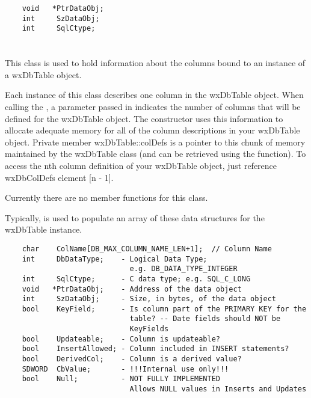 \begin{verbatim}
    void   *PtrDataObj;
    int     SzDataObj;
    int     SqlCtype;
\end{verbatim}


\section{}\label{wxdbcoldef}

This class is used to hold information about the columns bound to an 
instance of a wxDbTable object.  

Each instance of this class describes one column in the wxDbTable 
object.  When calling the , a 
parameter passed in indicates the number of columns that will be defined for 
the wxDbTable object.  The constructor uses this information to allocate 
adequate memory for all of the column descriptions in your wxDbTable object.  
Private member wxDbTable::colDefs is a pointer to this chunk of memory 
maintained by the wxDbTable class (and can be retrieved using the 
 function).  
To access the nth column definition of your wxDbTable object, just reference 
wxDbColDefs element [n - 1].

Currently there are no member functions for this class.

Typically,  is used to 
populate an array of these data structures for the wxDbTable instance.

\begin{verbatim}
    char    ColName[DB_MAX_COLUMN_NAME_LEN+1];  // Column Name
    int     DbDataType;    - Logical Data Type; 
                             e.g. DB_DATA_TYPE_INTEGER
    int     SqlCtype;      - C data type; e.g. SQL_C_LONG
    void   *PtrDataObj;    - Address of the data object
    int     SzDataObj;     - Size, in bytes, of the data object
    bool    KeyField;      - Is column part of the PRIMARY KEY for the
                             table? -- Date fields should NOT be 
                             KeyFields
    bool    Updateable;    - Column is updateable?
    bool    InsertAllowed; - Column included in INSERT statements?
    bool    DerivedCol;    - Column is a derived value?
    SDWORD  CbValue;       - !!!Internal use only!!!
    bool    Null;          - NOT FULLY IMPLEMENTED
                             Allows NULL values in Inserts and Updates
\end{verbatim}

